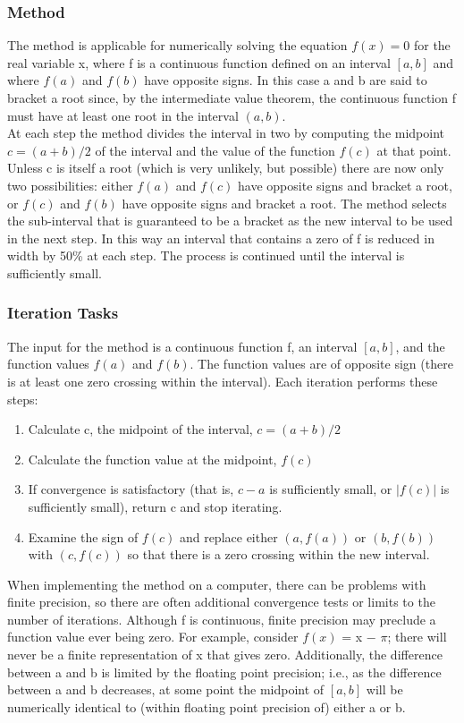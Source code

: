 \documentclass[a4paper, 12pt]{report}
\begin{document}
    \subsubsection{Method}
    The method is applicable for numerically solving the equation $f(x) = 0$ for the real variable x, where f is a continuous function defined on an interval $[a, b]$ and where $f(a)$ and $f(b)$ have opposite signs. In this case a and b are said to bracket a root since, by the intermediate value theorem, the continuous function f must have at least one root in the interval $(a,b)$.\\
    At each step the method divides the interval in two by computing the midpoint $c = (a+b) / 2$ of the interval and the value of the function $f(c)$ at that point. Unless c is itself a root (which is very unlikely, but possible) there are now only two possibilities: either $f(a)$ and $f(c)$ have opposite signs and bracket a root, or $f(c)$ and $f(b)$ have opposite signs and bracket a root. The method selects the sub-interval that is guaranteed to be a bracket as the new interval to be used in the next step. In this way an interval that contains a zero of f is reduced in width by 50\% at each step. The process is continued until the interval is sufficiently small.
    \subsubsection{Iteration Tasks}
    The input for the method is a continuous function f, an interval $[a, b]$, and the function values $f(a)$ and $f(b)$. The function values are of opposite sign (there is at least one zero crossing within the interval). Each iteration performs these steps:
    \begin{enumerate}
        \item Calculate c, the midpoint of the interval, $c = (a+b)/2$
        \item Calculate the function value at the midpoint, $f(c)$
        \item If convergence is satisfactory (that is, $c - a$ is sufficiently small, or $|f(c)|$ is sufficiently small), return c and stop iterating.
        \item Examine the sign of $f(c)$ and replace either $(a, f(a))$ or $(b, f(b))$ with $(c, f(c))$ so that there is a zero crossing within the new interval.
    \end{enumerate}
    When implementing the method on a computer, there can be problems with finite precision, so there are often additional convergence tests or limits to the number of iterations. Although f is continuous, finite precision may preclude a function value ever being zero. For example, consider $f(x)$ = x − $\pi$; there will never be a finite representation of x that gives zero. Additionally, the difference between a and b is limited by the floating point precision; i.e., as the difference between a and b decreases, at some point the midpoint of $[a, b]$ will be numerically identical to (within floating point precision of) either a or b.
\end{document}
